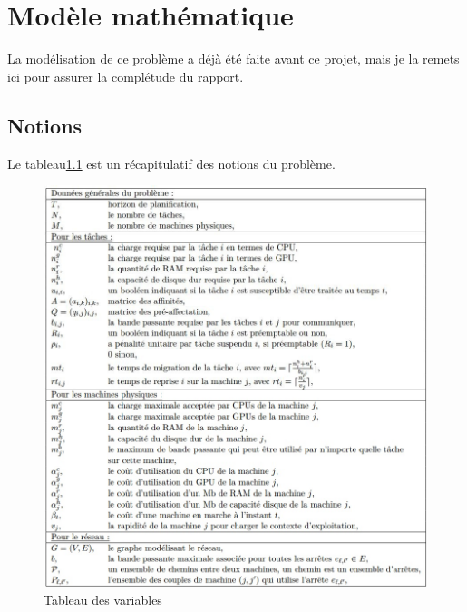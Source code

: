 \chapter{Modèle mathématique}
La modélisation de ce problème a déjà été faite avant ce projet, mais je la remets ici pour assurer la complétude du rapport.

\section{Notions}
Le tableau\ref{fig:var} est un récapitulatif des notions du problème.
\begin{figure}[!htbp]
	\centering
		\includegraphics[scale=0.8]{pics/var.jpg}
	\caption{Tableau des variables}
	\label{fig:var}
\end{figure}
